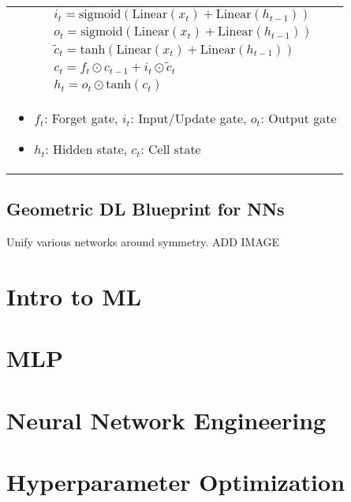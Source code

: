 \documentclass{article}
\begin{document}
\begin{summary}
\begin{center}
\begin{tabular}{llll}
            & & & $i_t = \text{sigmoid}(\text{Linear}(x_t) + \text{Linear}(h_{t-1}))$ \\
            & & & $o_t = \text{sigmoid}(\text{Linear}(x_t) + \text{Linear}(h_{t-1}))$ \\
            & & & $\tilde{c}_t = \text{tanh}(\text{Linear}(x_t) + \text{Linear}(h_{t-1}))$ \\
            & & & $c_t = f_t \odot c_{t-1} + i_t \odot \tilde{c}_t$ \\
            & & & $h_t = o_t \odot \text{tanh}(c_t)$ \\
            \multicolumn{4}{p{\linewidth}}{
            \begin{itemize}
                \item $f_t$: Forget gate, $i_t$: Input/Update gate, $o_t$: Output gate
                \item $h_t$: Hidden state, $c_t$: Cell state
            \end{itemize}} \\
            \bottomrule
        \end{tabular}
    \end{center}
\end{summary}

\subsection{Geometric DL Blueprint for NNs}
\begin{summary}
    Unify various networks around symmetry. 
    ADD IMAGE
\end{summary}
\newpage

\section{Intro to ML}

\newpage

\section{MLP}

\newpage

\section{Neural Network Engineering}

\newpage

\section{Hyperparameter Optimization}

\newpage
\end{document}
